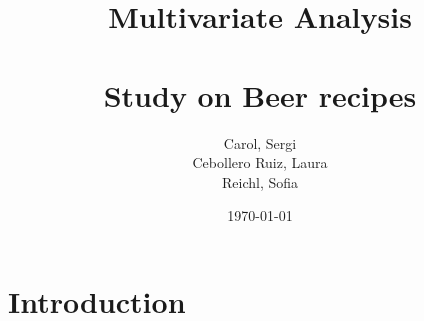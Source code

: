 
%


\title{ \Large Multivariate Analysis \\~\\  \huge \textbf{Study on Beer recipes}}
\author{Carol, Sergi \\ Cebollero Ruiz, Laura \\ Reichl, Sofia}
\date{\today}



\maketitle


\tableofcontents

\newpage
\section{Introduction}

